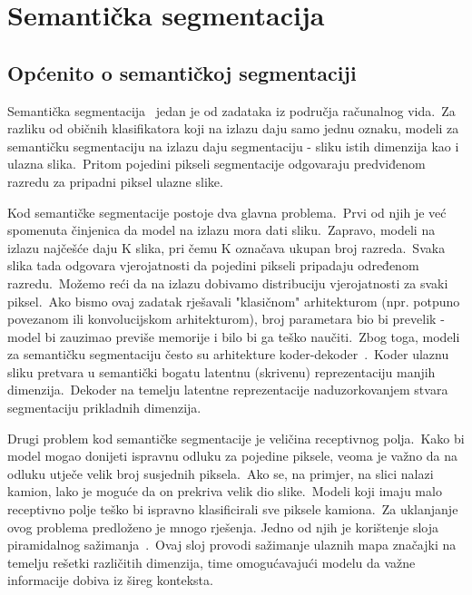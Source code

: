 \documentclass[times, utf8, seminar, numeric]{fer}
\begin{document}
\chapter{Semantička segmentacija}

\section{Općenito o semantičkoj segmentaciji}

Semantička segmentacija~\cite{garcia2017review} jedan je od zadataka iz područja računalnog vida.\ 
Za razliku od običnih klasifikatora koji na izlazu daju samo jednu oznaku, modeli za semantičku segmentaciju na izlazu daju segmentaciju - sliku istih dimenzija kao i ulazna slika.\ 
Pritom pojedini pikseli segmentacije odgovaraju predviđenom razredu za pripadni piksel ulazne slike.\ 

Kod semantičke segmentacije postoje dva glavna problema.\ Prvi od njih je već spomenuta činjenica da model na izlazu mora dati sliku.\ 
Zapravo, modeli na izlazu najčešće daju K slika, pri čemu K označava ukupan broj razreda.\ Svaka slika tada odgovara vjerojatnosti da pojedini pikseli pripadaju određenom razredu.\ 
Možemo reći da na izlazu dobivamo distribuciju vjerojatnosti za svaki piksel.\
Ako bismo ovaj zadatak rješavali "klasičnom" arhitekturom (npr. potpuno povezanom ili konvolucijskom arhitekturom), broj parametara bio bi prevelik - model bi zauzimao previše memorije i bilo bi ga teško naučiti.\
Zbog toga, modeli za semantičku segmentaciju često su arhitekture koder-dekoder~\cite{badrinarayanan2017segnet}.\ 
Koder ulaznu sliku pretvara u semantički bogatu latentnu (skrivenu) reprezentaciju manjih dimenzija.\ 
Dekoder na temelju latentne reprezentacije naduzorkovanjem stvara segmentaciju prikladnih dimenzija.\
  
Drugi problem kod semantičke segmentacije je veličina receptivnog polja.\ 
Kako bi model mogao donijeti ispravnu odluku za pojedine piksele, veoma je važno da na odluku utječe velik broj susjednih piksela.\
Ako se, na primjer, na slici nalazi kamion, lako je moguće da on prekriva velik dio slike.\ 
Modeli koji imaju malo receptivno polje teško bi ispravno klasificirali sve piksele kamiona.\ 
Za uklanjanje ovog problema predloženo je mnogo rješenja. Jedno od njih je korištenje sloja piramidalnog sažimanja~\cite{he2015spatial}.\
Ovaj sloj provodi sažimanje ulaznih mapa značajki na temelju rešetki različitih dimenzija, time omogućavajući modelu da važne informacije dobiva iz šireg konteksta.\ 
\end{document}
